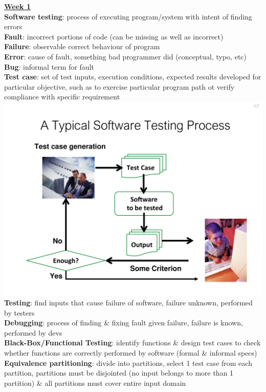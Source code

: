 \documentclass[a4paper]{article}
\begin{document}
    \begin{multicols}{3}
        \scriptsize
        \noindent\underline{\textbf{Week 1}}\\
        \textbf{Software testing}: process of executing program/system with intent of finding errors\\
        \textbf{Fault}: incorrect portions of code (can be missing as well as incorrect)\\
        \textbf{Failure}: observable correct behaviour of program\\
        \textbf{Error}: cause of fault, something bad programmer did (conceptual, typo, etc)\\
        \textbf{Bug}: informal term for fault\\
        \textbf{Test case}: set of test inputs, execution conditions, expected results developed for particular objective, such as to exercise particular program path ot verify compliance with specific requirement\\
        \includegraphics[width=\linewidth]{22.pdf}\\
        \textbf{Testing}: find inputs that cause failure of software, failure unknown, performed by testers\\
        \textbf{Debugging}: process of finding \& fixing fault given failure, failure is known, performed by devs\\
        \textbf{Black-Box/Functional Testing}: identify functions \& design test cases to check whether functions are correctly performed by software (formal \& informal specs)\\
        \textbf{Equivalence partitioning}: divide into partitions, select 1 test case from each partition, partitions must be disjointed (no input belongs to more than 1 partition) \& all partitions must cover entire input domain\\

\end{multicols}
\end{document}
